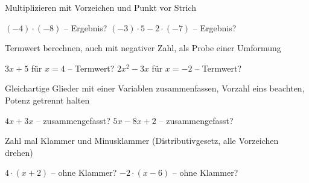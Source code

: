 \setcounter{aufgabe}{0}

\begin{aufgabe}{Multiplizieren mit Vorzeichen und Punkt vor Strich}
\begin{teile}
\teil $(-4) \cdot (-8)$ – Ergebnis? \leerfeld
\teil $(-3) \cdot 5 - 2 \cdot (-7)$ – Ergebnis? \leerfeld
\end{teile}
\end{aufgabe}

\begin{aufgabe}{Termwert berechnen, auch mit negativer Zahl, als Probe einer Umformung}
\begin{teile}
\teil $3x + 5$ für $x = 4$ – Termwert? \leerfeld
\teil $2x^2 - 3x$ für $x = -2$ – Termwert? \leerfeld
\end{teile}
\end{aufgabe}

\begin{aufgabe}{Gleichartige Glieder mit einer Variablen zusammenfassen, Vorzahl eins beachten, Potenz getrennt halten}
\begin{teile}
\teil $4x + 3x$ – zusammengefasst? \leerfeld
\teil $5x - 8x + 2$ – zusammengefasst? \leerfeld
\end{teile}
\end{aufgabe}

\begin{aufgabe}{Zahl mal Klammer und Minusklammer (Distributivgesetz, alle Vorzeichen drehen)}
\begin{teile}
\teil $4 \cdot (x + 2)$ – ohne Klammer? \leerfeld
\teil $-2 \cdot (x - 6)$ – ohne Klammer? \leerfeld
\end{teile}
\end{aufgabe}

